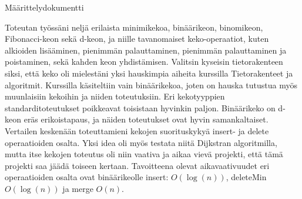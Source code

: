 \documentclass[12pt]{report}
\begin{document}
\begin{center}
  Määrittelydokumentti
\end{center}
Toteutan työssäni neljä erilaista minimikekoa, binäärikeon, binomikeon, Fibonacci-keon sekä d-keon, ja niille tavanomaiset keko-operaatiot, kuten alkioiden lisääminen, pienimmän palauttaminen, pienimmän palauttaminen ja poistaminen, sekä kahden keon yhdistämisen. 
Valitsin kyseisin tietorakenteen siksi, että keko oli mielestäni yksi hauskimpia aiheita kurssilla Tietorakenteet ja algoritmit. Kurssilla käsiteltiin vain binäärikekoa, joten on hauska tutustua myös muunlaisiin kekoihin ja niiden toteutuksiin. Eri kekotyyppien standarditoteutukset poikkeavat toisistaan hyvinkin paljon. Binäärikeko on d-keon eräs erikoistapaus, ja näiden toteutukset ovat hyvin samankaltaiset. 
Vertailen keskenään toteuttamieni kekojen suorituskykyä insert- ja delete operaatioiden osalta. Yksi idea oli myös testata niitä Dijkstran algoritmilla, mutta itse kekojen toteutus oli niin vaativa ja aikaa vievä projekti, että tämä projekti saa jäädä toiseen kertaan. 
Tavoitteena olevat aikavaativuudet eri operaatioiden osalta ovat binäärikeolle insert: $O (\log (n))$, deleteMin $O (\log (n))$ ja merge $O(n)$.
\end{document}
